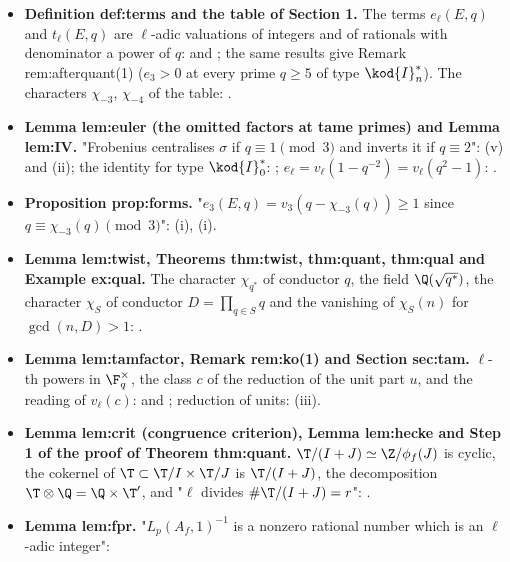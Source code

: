 \begin{itemize}
\item \textbf{Definition def:terms and the table of Section 1.} The terms $e_\ell(E,q)$ and $t_\ell(E,q)$ are $\ell$-adic valuations
of integers and of rationals with denominator a power of $q$: 
and ; the same results give Remark rem:afterquant(1) ($e_3>0$ at every prime $q\ge5$ of type $\kod{I}_n^*$). The
characters $\chi_{-3}$, $\chi_{-4}$ of the table: .
\item \textbf{Lemma lem:euler (the omitted factors at tame primes) and Lemma lem:IV.} "Frobenius centralises $\sigma$ if
$q\equiv1\pmod3$ and inverts it if $q\equiv2$": (v) and (ii); the
identity for type $\kod{I}_0^*$: ; $e_\ell=v_\ell(1-q^{-2})=v_\ell(q^2-1)$: .
\item \textbf{Proposition prop:forms.} "$e_3(E,q)=v_3(q-\chi_{-3}(q))\ge1$ since $q\equiv\chi_{-3}(q)\pmod3$": (i),
(i).
\item \textbf{Lemma lem:twist, Theorems thm:twist, thm:quant, thm:qual and Example ex:qual.} The character $\chi_{q^*}$ of
conductor $q$, the field $\Q(\sqrt{q^*})$, the character $\chi_S$ of conductor $D=\prod_{q\in S}q$ and the vanishing of
$\chi_S(n)$ for $\gcd(n,D)>1$: .
\item \textbf{Lemma lem:tamfactor, Remark rem:ko(1) and Section sec:tam.} $\ell$-th powers in $\F_q^\times$, the class $c$ of the
reduction of the unit part $u$, and the reading of $v_\ell(c)$:  and
; reduction of units: (iii).
\item \textbf{Lemma lem:crit (congruence criterion), Lemma lem:hecke and Step 1 of the proof of Theorem thm:quant.}
$\T/(I+J)\simeq\Z/\phi_f(J)$ is cyclic, the cokernel of $\T\subset\T/I\times\T/J$ is $\T/(I+J)$, the decomposition
$\T\otimes\Q=\Q\times\T'$, and "$\ell$ divides $\#\T/(I+J)=r$": .
\item \textbf{Lemma lem:fpr.} "$L_p(A_f,1)^{-1}$ is a nonzero rational number which is an $\ell$-adic integer":

\end{itemize}
